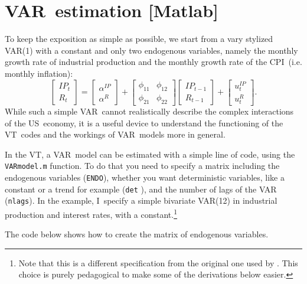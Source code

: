\documentclass[10pt]{article}
\begin{document}
\section{VAR\ estimation {\color{note} {\protect\small {[Matlab]}}}}

To keep the exposition as simple as possible, we start from a vary stylized
VAR(1) with a constant and only two endogenous variables, namely the monthly
growth rate of industrial production and the monthly growth rate of the CPI\
(i.e. monthly inflation):%
\begin{equation*}
\begin{bmatrix}
IP_{t} \\
R_{t}%
\end{bmatrix}%
=%
\begin{bmatrix}
\alpha ^{IP} \\
\alpha ^{R}%
\end{bmatrix}%
+\left[
\begin{array}{cc}
\phi _{11} & \phi _{12} \\
\phi _{21} & \phi _{22}%
\end{array}%
\right]
\begin{bmatrix}
IP_{t-1} \\
R_{t-1}%
\end{bmatrix}%
+%
\begin{bmatrix}
u_{t}^{IP} \\
u_{t}^{R}%
\end{bmatrix}%
.
\end{equation*}%
While such a simple VAR\ cannot realistically describe the complex
interactions of the US\ economy, it is a useful device to understand the
functioning of the VT\ codes and the workings of VAR\ models more in general.

In the VT, a VAR\ model can be estimated with a simple line of code, using
the \texttt{VARmodel.m} function. To do that you need to specify a matrix
including the endogenous variables (\texttt{ENDO}), whether you want
deterministic variables, like a constant or a trend for example (\texttt{det}%
), and the number of lags of the VAR (\texttt{nlags}). In the example, I\
specify a simple bivariate VAR(12) in industrial production and interest
rates, with a constant.\footnote{%
Note that this is a different specification from the original one used by
\cite{GertlerKaradi2015}. This choice is purely pedagogical to make some of
the derivations below easier.}

The code below shows how to create the matrix of endogenous variables.
\end{document}
